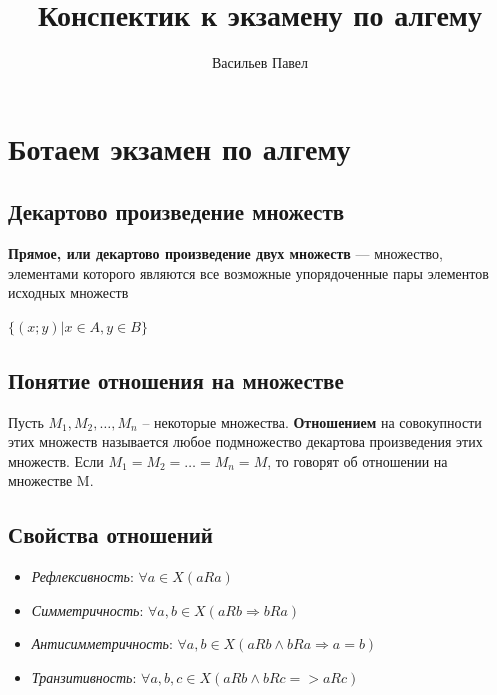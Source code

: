 \documentclass[a4paper]{article}
\title{Конспектик к экзамену по алгему}
\author{Васильев Павел}
\begin{document}
\section*{Ботаем экзамен по алгему}

\begin{center}\begin{Large}\end{Large}\end{center}

\subsection*{Декартово произведение множеств}

\begin{definit}
\textbf{Прямое, или декартово произведение двух множеств} — множество, элементами которого являются все возможные упорядоченные пары элементов исходных множеств
\end{definit}

$\{ (x;y) | x \in A, y \in B \}$

\subsection*{Понятие отношения на множестве
}

\begin{definit}
Пусть $M_1, M_2, …, M_n$ – некоторые множества.
\textbf{Отношением} на совокупности этих множеств называется любое подмножество
декартова произведения этих множеств. Если $M_1 = M_2 = … = M_n = M$, то говорят об отношении на множестве M.
\end{definit}

\subsection*{Свойства отношений}

\begin{itemize}
\item \textit{Рефлексивность}: $\forall a \in X (a R a)$
\item \textit{Симметричность}: $\forall a, b \in X (a R b \Rightarrow b R a)$
\item \textit{Антисимметричность}: $\forall a, b \in X (a R b \land b R a \Rightarrow a = b)$
\item \textit{Транзитивность}: $\forall a, b, c \in X (a R b \land b R c => a R c)$


\end{itemize}
\end{document}
